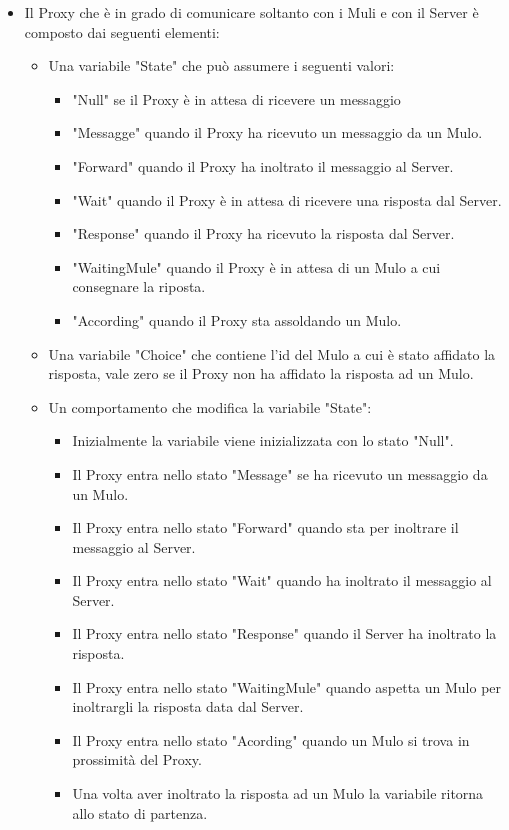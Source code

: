 \documentclass[13pt,a4paper]{article}
\begin{document}
\begin{itemize}
		
		\item Il Proxy che è in grado di comunicare soltanto con i Muli e con il Server è composto dai seguenti elementi: 
		\begin{itemize}
			\item Una variabile "State" che può assumere i seguenti valori:
			\begin{itemize}
				\item "Null" se il Proxy è in attesa di ricevere un messaggio
				\item "Messagge" quando il Proxy ha ricevuto un messaggio da un Mulo.
				\item "Forward" quando il Proxy ha inoltrato il messaggio al Server.
				\item "Wait" quando il Proxy è in attesa di ricevere una risposta dal Server.
				\item "Response" quando il Proxy ha ricevuto la risposta dal Server.
				\item "WaitingMule" quando il Proxy è in attesa di un Mulo a cui consegnare la riposta. 
				\item "According" quando il Proxy sta assoldando un Mulo.
			\end{itemize}
		\item Una variabile "Choice" che contiene l'id del Mulo a cui è stato affidato la risposta, vale zero se il Proxy non ha  affidato la risposta ad un Mulo.
		\item Un comportamento che modifica la variabile "State":
		\begin{itemize}
			\item Inizialmente la variabile viene inizializzata con lo stato "Null".
			\item Il Proxy entra nello stato "Message" se ha ricevuto un messaggio da un Mulo.
			\item Il Proxy entra nello stato "Forward" quando sta per inoltrare il messaggio al Server.
			\item Il Proxy entra nello stato "Wait" quando ha inoltrato il messaggio al Server.
			\item Il Proxy entra nello stato "Response" quando il Server ha inoltrato la risposta.
			\item Il Proxy entra nello stato "WaitingMule" quando aspetta un Mulo per inoltrargli la risposta data dal Server.
			\item Il Proxy entra nello stato "Acording" quando un Mulo si trova in prossimità del Proxy.
			\item Una volta aver inoltrato la risposta ad un Mulo la variabile ritorna allo stato di partenza.

\end{itemize}
\end{itemize}
\end{itemize}
\end{document}
